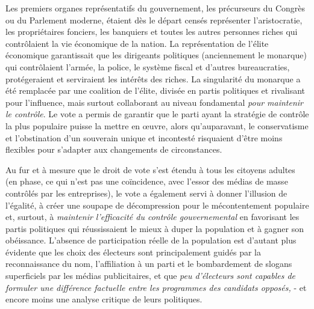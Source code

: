 Les premiers organes représentatifs du gouvernement, les précurseurs du Congrès ou du Parlement moderne, étaient dès le départ censés représenter l'aristocratie, les propriétaires fonciers, les banquiers et toutes les autres personnes riches qui contrôlaient la vie économique de la nation. La représentation de l'élite économique garantissait que les dirigeants politiques (anciennement le monarque) qui contrôlaient l'armée, la police, le système fiscal et d'autres bureaucraties, protégeraient et serviraient les intérêts des riches. La singularité du monarque a été remplacée par une coalition de l'élite, divisée en partis politiques et rivalisant pour l'influence, mais surtout collaborant au niveau fondamental \emph{pour maintenir le contrôle}. Le vote a permis de garantir que le parti ayant la stratégie de contrôle la plus populaire puisse la mettre en œuvre, alors qu'auparavant, le conservatisme et l'obstination d'un souverain unique et incontesté risquaient d'être moins flexibles pour s'adapter aux changements de circonstances.

Au fur et à mesure que le droit de vote s'est étendu à tous les citoyens adultes (en phase, ce qui n'est pas une coïncidence, avec l'essor des médias de masse contrôlés par les entreprises), le vote a également servi à donner l'illusion de l'égalité, à créer une soupape de décompression pour le mécontentement populaire et, surtout, à \emph{maintenir l'efficacité du contrôle gouvernemental} en favorisant les partis politiques qui réussissaient le mieux à duper la population et à gagner son obéissance. L'absence de participation réelle de la population est d'autant plus évidente que les choix des électeurs sont principalement guidés par la reconnaissance du nom, l'affiliation à un parti et le bombardement de slogans superficiels par les médias publicitaires, et que \emph{peu d'électeurs sont capables de formuler une différence factuelle entre les programmes des candidats opposés,} - et encore moins une analyse critique de leurs politiques.


